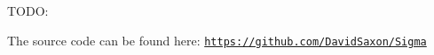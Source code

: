 T\+O\+D\+O\+:

The source code can be found here\+: \href{https://github.com/DavidSaxon/Sigma}{\tt https\+://github.\+com/\+David\+Saxon/\+Sigma} 